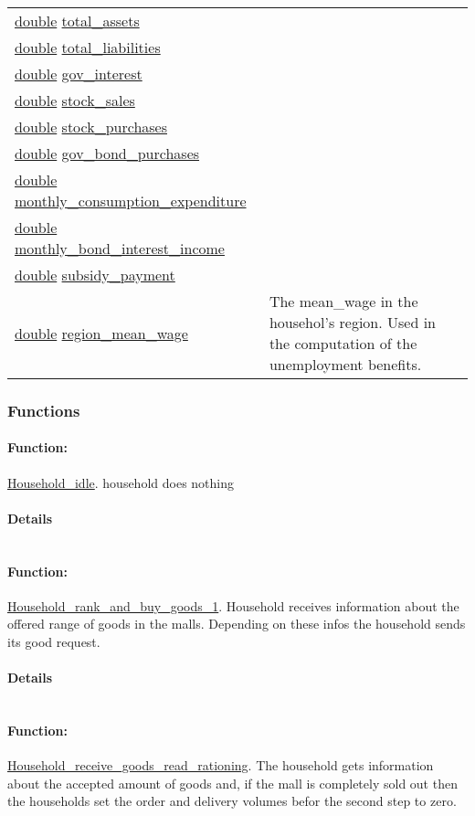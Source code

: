 \documentclass[a4paper,11pt]{article}
\begin{document}
\begin{center}
\begin{longtable}[H!]{ll}
\url{double} \url{total_assets} & \parbox{10cm}{} \\
\url{double} \url{total_liabilities} & \parbox{10cm}{} \\
\url{double} \url{gov_interest} & \parbox{10cm}{} \\
\url{double} \url{stock_sales} & \parbox{10cm}{} \\
\url{double} \url{stock_purchases} & \parbox{10cm}{} \\
\url{double} \url{gov_bond_purchases} & \parbox{10cm}{} \\
\url{double} \url{monthly_consumption_expenditure} & \parbox{10cm}{} \\
\url{double} \url{monthly_bond_interest_income} & \parbox{10cm}{} \\
\url{double} \url{subsidy_payment} & \parbox{10cm}{} \\
\url{double} \url{region_mean_wage} & \parbox{10cm}{The mean\_wage in the househol's region. Used in the computation of the unemployment benefits.} \\
\end{longtable}
\end{center}
\subsubsection{Functions}
\paragraph{Function:}\url{Household_idle}.
household does nothing
\paragraph{Details}
\begin{verbatim}
\end{verbatim}
\paragraph{Function:}\url{Household_rank_and_buy_goods_1}.
Household receives information about the offered range 
of goods in the malls. Depending on these infos the household 
sends its good request.
\paragraph{Details}
\begin{verbatim}
\end{verbatim}
\paragraph{Function:}\url{Household_receive_goods_read_rationing}.
The household gets information about the accepted amount of 
goods and, if the mall is completely sold out then the households set the 
order and delivery volumes befor the second step to zero.
\end{document}
